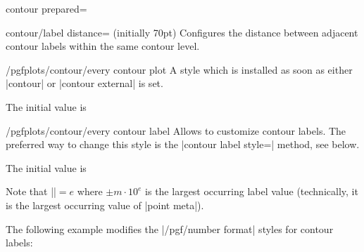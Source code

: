 {{\begin{plottype}[/pgfplots]{contour prepared=\textcolor{black}{}}
    \begin{pgfplotskey}{contour/label distance= (initially 70pt)}
        Configures the distance between adjacent contour labels within the same
        contour level.
    \end{pgfplotskey}

    \begin{stylekey}{/pgfplots/contour/every contour plot}
        A style which is installed as soon as either |contour| or
        |contour external| is set.

        The initial value is
\begin{codeexample}
\end{codeexample}
    \end{stylekey}

    \begin{stylekey}{/pgfplots/contour/every contour label}
        Allows to customize contour labels. The preferred way to change this
        style is the |contour label style=| method, see below.

        The initial value is
\begin{codeexample}
\end{codeexample}
    \noindent Note that |\pgfplotspointmetarangeexponent|$=e$ where $\pm m
    \cdot 10^e$ is the largest occurring label value (technically, it is the
    largest occurring value of |point meta|).

    The following example modifies the |/pgf/number format| styles for contour
    labels:
\begin{codeexample}[]
\end{codeexample}
    \end{stylekey}


\end{plottype}}}
